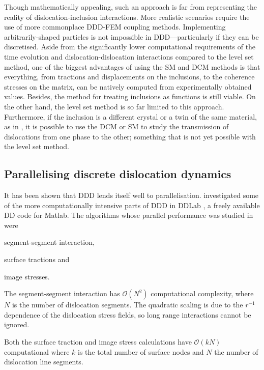 Though mathematically appealing, such an approach is far from representing the reality of dislocation-inclusion interactions. More realistic scenarios require the use of more commonplace DDD-FEM coupling methods. Implementing arbitrarily-shaped particles is not impossible in DDD---particularly if they can be discretised. Aside from the significantly lower computational requirements of the time evolution and dislocation-dislocation interactions compared to the level set method, one of the biggest advantages of using the SM and DCM methods is that everything, from tractions and displacements on the inclusions, to the coherence stresses on the matrix, can be natively computed from experimentally obtained values. Besides, the method for treating inclusions as functions is still viable. On the other hand, the level set method is so far limited to this approach. Furthermore, if the inclusion is a different crystal or a twin of the same material, as in \cite{twinning}, it is possible to use the DCM or SM to study the transmission of dislocations from one phase to the other; something that is not yet possible with the level set method.

\subsection{Parallelising discrete dislocation dynamics}
\label{ss:parallel_ddd}
It has been shown that DDD lends itself well to parallelisation.  investigated some of the more computationally intensive parts of DDD in DDLab \cite{ddlab}, a freely available DD code for Matlab. The algorithms whose parallel performance was studied in \cite{gpu_ddd} were
\begin{inparaenum}
    \item segment-segment interaction,
    \item surface tractions and
    \item image stresses.
\end{inparaenum}

The segment-segment interaction has $ \mathcal{O}(N^{2}) $ computational complexity, where $ N $ is the number of dislocation segments. The quadratic scaling is due to the $ r^{-1} $ dependence of the dislocation stress fields, so long range interactions cannot be ignored.

Both the surface traction and image stress calculations have $ \mathcal{O}(k N) $ computational where $ k $ is the total number of surface nodes and $ N $ the number of dislocation line segments.

